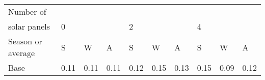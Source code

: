 \begin{table}[h] 
\centering 
\begin{tabular}{l|lll|lll|lll}Number of \\ solar panels&0& & &2& & &4& & \\ \hline 
Season or average & S & W & A & S & W & A & S & W & A \\ \hline 
Base&0.11&0.11&0.11&0.12&0.15&0.13&0.15&0.09&0.12 \\ 
\end{tabular} 
\end{table}